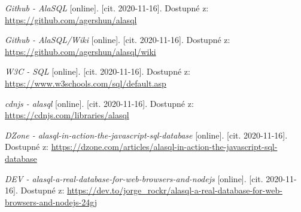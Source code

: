 \documentclass[a4, titlepage]{article}
\begin{document}
\begin{thebibliography}{9}
\textit{Github - AlaSQL} [online]. [cit. 2020-11-16]. Dostupné z: 
\url{https://github.com/agershun/alasql}

\textit{Github - AlaSQL/Wiki} [online]. [cit. 2020-11-16]. Dostupné z: 
\url{https://github.com/agershun/alasql/wiki}

\textit{W3C - SQL} [online]. [cit. 2020-11-16]. Dostupné z: 
\url{https://www.w3schools.com/sql/default.asp}

\textit{cdnjs - alasql} [online]. [cit. 2020-11-16]. Dostupné z: 
\url{https://cdnjs.com/libraries/alasql}

\textit{DZone - alasql-in-action-the-javascript-sql-database} [online]. [cit. 2020-11-16]. Dostupné z: 
\url{https://dzone.com/articles/alasql-in-action-the-javascript-sql-database}

\textit{DEV - alasql-a-real-database-for-web-browsers-and-nodejs} [online]. [cit. 2020-11-16]. Dostupné z: 
\url{https://dev.to/jorge_rockr/alasql-a-real-database-for-web-browsers-and-nodejs-24gj}

\end{thebibliography}

\newpage
\listoffigures
\end{document}
